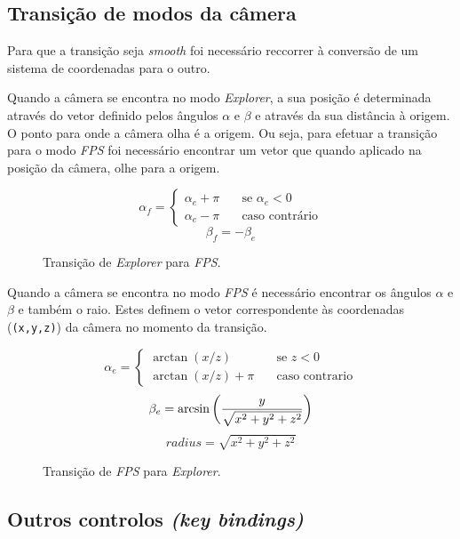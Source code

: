 \documentclass[a4paper]{article}
\begin{document}
\subsection{Transição de modos da câmera}

Para que a transição seja \textit{smooth} foi necessário reccorrer à conversão de um sistema de coordenadas para o outro.

Quando a câmera se encontra no modo \textit{Explorer}, a sua posição é determinada através do vetor definido pelos ângulos $\alpha$ e $\beta$ e através da sua distância à origem. O ponto para onde a câmera olha é a origem. Ou seja, para efetuar a transição para o modo \textit{FPS} foi necessário encontrar um vetor que quando aplicado na posição da câmera, olhe para a origem.

\begin{figure}[H]
    \[
        \alpha_f =
        \begin{cases}
            \alpha_e + \pi & \quad \text{se } \alpha_e < 0\\
            \alpha_e - \pi & \quad \text{caso contrário}
        \end{cases}
    \]
    \[
        \beta_f = -\beta_e
    \]
    \caption{Transição de \textit{Explorer} para \textit{FPS}.}
\end{figure}

Quando a câmera se encontra no modo \textit{FPS} é necessário encontrar os ângulos $\alpha$ e $\beta$ e também o raio. Estes definem o vetor correspondente às coordenadas (\texttt{(x,y,z)}) da câmera no momento da transição.

\begin{figure}[H]
    \[
        \alpha_e =
        \begin{cases}
            \arctan(x / z)       & \quad \text{se } z < 0\\
            \arctan(x / z) + \pi & \quad \text{caso contrario}
        \end{cases}
    \]
    \[
        \beta_e = \arcsin\bigg(\frac{y}{\sqrt{x^2 + y^2 + z^2}}\bigg)\\
    \]
    \[
        radius = \sqrt{x^2 + y^2 + z^2}
    \]
    \caption{Transição de \textit{FPS} para \textit{Explorer}.}
\end{figure}

\subsection{Outros controlos \textit{(key bindings)}}
\end{document}
